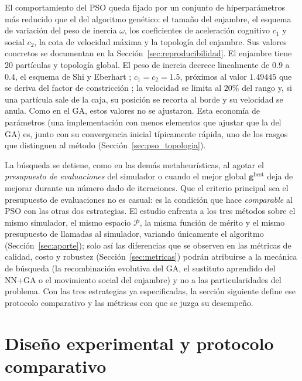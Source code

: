 El comportamiento del PSO queda fijado por un conjunto de hiperparámetros más
reducido que el del algoritmo genético: el tamaño del enjambre, el esquema de
variación del peso de inercia $\omega$, los coeficientes de aceleración cognitivo
$c_1$ y social $c_2$, la cota de velocidad máxima y la topología del enjambre. Sus
valores concretos se documentan en la Sección~\ref{sec:reproducibilidad}.
El enjambre tiene $20$ partículas y topología global. El peso de inercia decrece
linealmente de $0.9$ a $0.4$, el esquema de Shi y Eberhart \cite{ShiEberhart1998};
$c_1=c_2=1.5$, próximos al valor $1.49445$ que se deriva del factor de constricción
\cite{ClercKennedy2002,EberhartShi2000}; la velocidad se limita al $20\%$ del rango y,
si una partícula sale de la caja, su posición se recorta al borde y su velocidad se
anula. Como en el GA, estos valores no se ajustaron. Esta
economía de parámetros (una implementación con menos elementos que ajustar que la del
GA) es, junto con su convergencia inicial típicamente rápida, uno de los rasgos que
distinguen al método (Sección~\ref{sec:pso_topologia}).

La búsqueda se detiene, como en las demás metaheurísticas, al agotar el
\emph{presupuesto de evaluaciones} del simulador o cuando el mejor global
$\mathbf{g}^{\text{best}}$ deja de mejorar durante un número dado de iteraciones. Que
el criterio principal sea el presupuesto de evaluaciones no es casual: es la
condición que hace \emph{comparable} al PSO con las otras dos estrategias. El estudio
enfrenta a los tres métodos sobre el mismo simulador, el mismo espacio $\mathcal{P}$,
la misma función de mérito y el mismo presupuesto de llamadas al simulador, variando
únicamente el algoritmo (Sección~\ref{sec:aporte}); solo así las diferencias que se
observen en las métricas de calidad, costo y robustez (Sección~\ref{sec:metricas})
podrán atribuirse a la mecánica de búsqueda (la recombinación evolutiva del GA, el
sustituto aprendido del NN+GA o el movimiento social del enjambre) y no a las
particularidades del problema. Con las tres estrategias ya especificadas, la sección
siguiente define ese protocolo comparativo y las métricas con que se juzga su
desempeño.



\section{Diseño experimental y protocolo comparativo}
\label{sec:diseno_experimental}

